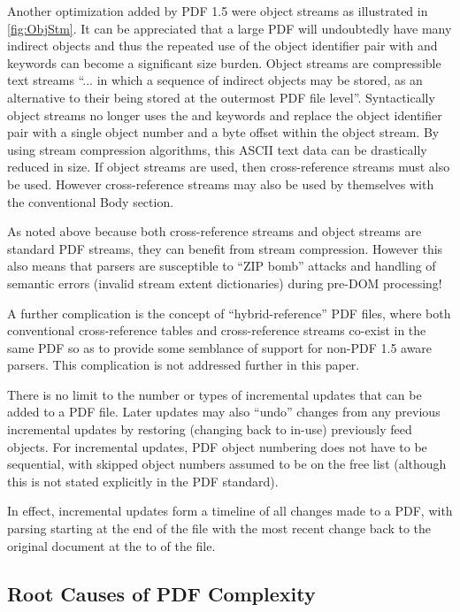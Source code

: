 Another optimization added by PDF 1.5 were object streams as illustrated in \cref{fig:ObjStm}.
It can be appreciated that a large PDF will
undoubtedly have many indirect objects and thus the repeated use of the object identifier pair with 
 and  keywords can become a significant size burden. Object streams are
compressible text streams ``... in which a sequence of indirect objects may be stored, as an 
alternative to their being stored at the outermost PDF file level''. 
Syntactically object streams no longer uses the  and  keywords and replace 
the object identifier pair with a single object number and a byte offset within the object stream. 
By using stream compression algorithms, this ASCII text data can be drastically reduced in size.
If object streams are used, then cross-reference streams must also be used. However cross-reference 
streams may also be used by themselves with the conventional Body section.

As noted above because both cross-reference streams and object streams are standard PDF streams, they 
can benefit from stream compression. However this also means that parsers are   
susceptible to ``ZIP bomb''  attacks and handling of semantic errors (invalid stream extent dictionaries) 
during pre-DOM processing!

A further complication is the concept of ``hybrid-reference'' PDF files, where both conventional cross-reference tables and cross-reference streams co-exist in the same PDF so as to provide some semblance of support for non-PDF 1.5 aware parsers. This complication is not addressed further in this paper.

There is no limit to the number or types of incremental updates that can be added to a PDF file. Later
updates may also ``undo'' changes from any previous incremental updates by restoring (changing back to in-use)
previously feed objects. For incremental updates, PDF object numbering 
does not have to be sequential, with skipped object numbers assumed to be on
the free list (although this is not stated explicitly in the PDF standard).

In effect, incremental updates form a timeline of all changes made to a PDF, with parsing starting
at the end of the file with the most recent change back to the original document at the to of the file.

\subsection{Root Causes of PDF Complexity}
\label{sec:rootcause}

